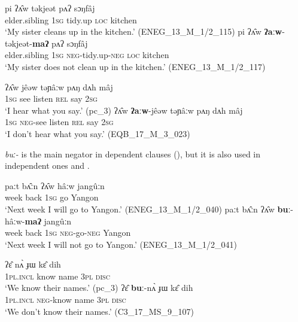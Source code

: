 \documentclass[output=paper,colorlinks,citecolor=brown]{langscibook}
\begin{document}
\ea\label{ex:rum:1}
    \ea\label{ex:rum:1a}
        \gll pi	ʔʌ̂w	təkjeət	pʌʔ	sɔŋfâj \\ 
             elder.sibling 1\textsc{sg} tidy.up \textsc{loc} kitchen \\
        \glt ‘My sister cleans up in the kitchen.’ (ENEG\_13\_M\_1/2\_115)
    \ex\label{ex:rum:1b}
        \gll pi	ʔʌ̂w	\textbf{ʔaːw}-təkjeət-\textbf{maʔ}	pʌʔ	sɔŋfâj \\
             elder.sibling \textsc{1sg} \textsc{neg}{}-tidy.up-\textsc{neg} \textsc{loc} kitchen \\
        \glt ‘My sister does not clean up in the kitchen.’ (ENEG\_13\_M\_1/2\_117)
    \z
\z 

\ea\label{ex:rum:2}
    \ea\label{ex:rum:2a}
        \gll ʔʌ̂w	jêəw	təɲâːw	pʌŋ	dʌh	mâj \\ 
             1\textsc{sg} see listen \textsc{rel} say 2\textsc{sg} \\
        \glt  ‘I hear what you say.’ (pc\_3)
    \ex\label{ex:rum:2b}
        \gll ʔʌ̂w	\textbf{ʔaːw}-jêəw	təɲâːw	pʌŋ	dʌh	mâj \\
             1\textsc{sg} \textsc{neg}{}-see listen \textsc{rel} say 2\textsc{sg} \\
        \glt  ‘I don’t hear what you say.’ (EQB\_17\_M\_3\_023)
    \z
\z 

\textit{buː{}-} is the main negator in dependent clauses (), but it is also used in independent ones  and .

\ea\label{ex:rum:3}
    \ea\label{ex:rum:3a}
        \gll paːt	bʌ̂ːn	ʔʌ̂w	hâːw	jangûːn \\ 
              week back 1\textsc{sg} go Yangon \\
        \glt  ‘Next week I will go to Yangon.’ (ENEG\_13\_M\_1/2\_040)
    \ex\label{ex:rum:3b}
        \gll paːt	bʌ̂ːn	ʔʌ̂w	\textbf{buː}-hâːw-\textbf{maʔ}	jangûːn \\
              week back 1\textsc{sg} \textsc{neg}{}-go{}-\textsc{neg} Yangon \\
        \glt  ‘Next week I will not go to Yangon.’ (ENEG\_13\_M\_1/2\_041)
    \z
\z 

\ea\label{ex:rum:4}
    \ea\label{ex:rum:4a}
        \gll ʔɛ̂	nʌ̀	ɟɯ	kɛ̂	dih \\ 
              \textsc{1pl.incl} know name 3\textsc{pl} \textsc{disc} \\
        \glt ‘We know their names.’ (pc\_3)
    \ex\label{ex:rum:4b}
        \gll ʔɛ̂	\textbf{buː}-nʌ̀	ɟɯ	kɛ̂	dih \\
              \textsc{1pl.incl} \textsc{neg}{}-know name 3\textsc{pl} \textsc{disc} \\
        \glt  ‘We don’t know their names.’ (C3\_17\_MS\_9\_107)
    \z
\z 
\end{document}
